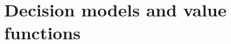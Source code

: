 \documentclass{report}
\begin{document}
\tableofcontents

\chapter{Decision models and value functions}


\newpage

{}
\end{document}

